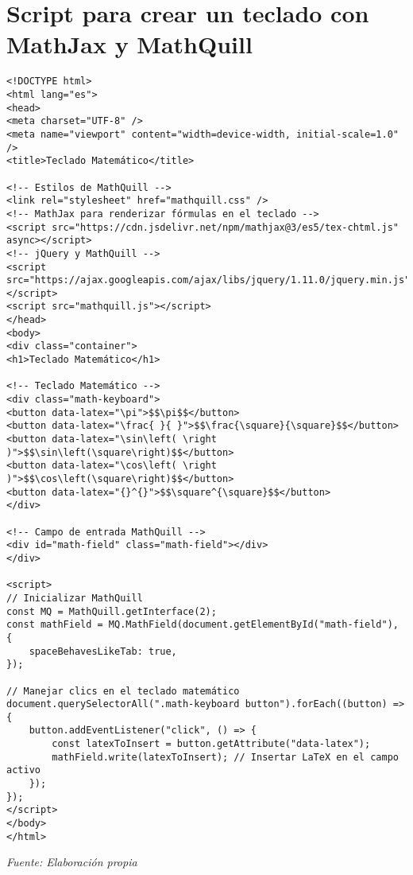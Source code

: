 \section{Script para crear un teclado con MathJax y MathQuill} \label{app3:mathquill_mathjax_keyboard}
\begin{longlisting}
	\begin{verbatim}
<!DOCTYPE html>
<html lang="es">
<head>
<meta charset="UTF-8" />
<meta name="viewport" content="width=device-width, initial-scale=1.0" />
<title>Teclado Matemático</title>

<!-- Estilos de MathQuill -->
<link rel="stylesheet" href="mathquill.css" />
<!-- MathJax para renderizar fórmulas en el teclado -->
<script src="https://cdn.jsdelivr.net/npm/mathjax@3/es5/tex-chtml.js" async></script>
<!-- jQuery y MathQuill -->
<script src="https://ajax.googleapis.com/ajax/libs/jquery/1.11.0/jquery.min.js"></script>
<script src="mathquill.js"></script>
</head>
<body>
<div class="container">
<h1>Teclado Matemático</h1>

<!-- Teclado Matemático -->
<div class="math-keyboard">
<button data-latex="\pi">$$\pi$$</button>
<button data-latex="\frac{ }{ }">$$\frac{\square}{\square}$$</button>
<button data-latex="\sin\left( \right )">$$\sin\left(\square\right)$$</button>
<button data-latex="\cos\left( \right )">$$\cos\left(\square\right)$$</button>
<button data-latex="{}^{}">$$\square^{\square}$$</button>
</div>

<!-- Campo de entrada MathQuill -->
<div id="math-field" class="math-field"></div>
</div>

<script>
// Inicializar MathQuill
const MQ = MathQuill.getInterface(2);
const mathField = MQ.MathField(document.getElementById("math-field"), {
	spaceBehavesLikeTab: true,
});

// Manejar clics en el teclado matemático
document.querySelectorAll(".math-keyboard button").forEach((button) => {
	button.addEventListener("click", () => {
		const latexToInsert = button.getAttribute("data-latex");
		mathField.write(latexToInsert); // Insertar LaTeX en el campo activo
	});
});
</script>
</body>
</html>
	\end{verbatim}
	\caption[Código para usar MathQuill y MathJax para crear un teclado e introducir datos en \TeX] {Código para usar MathQuill para introducir datos en \TeX}\textit{Fuente: Elaboración propia}
\end{longlisting}